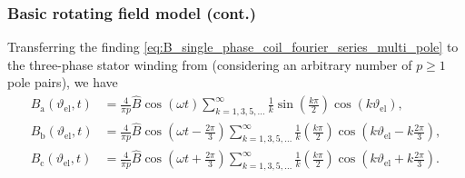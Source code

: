 \begin{frame}
	\frametitle{Basic rotating field model (cont.)}
    Transferring the finding \eqref{eq:B_single_phase_coil_fourier_series_multi_pole} to the three-phase stator winding from  (considering an arbitrary number of $p \geq 1$ pole pairs), we have
    \begin{equation}
        \begin{split}
            B_\mathrm{a}(\vartheta_\mathrm{el}, t) &= \frac{4}{\pi p} \hat{B} \cos(\omega t)\sum_{k=1,3,5,\ldots}^{\infty}   \frac{1}{k}\sin\left(\frac{k \pi}{2}\right) \cos(k \vartheta_\mathrm{el}),\\
            B_\mathrm{b}(\vartheta_\mathrm{el}, t) &= \frac{4}{\pi p} \hat{B} \cos\left(\omega t - \frac{2\pi}{3}\right)\sum_{k=1,3,5,\ldots}^{\infty}   \frac{1}{k}\left(\frac{k \pi}{2}\right) \cos\left(k \vartheta_\mathrm{el} - k\frac{2\pi}{3} \right),\\ 
            B_\mathrm{c}(\vartheta_\mathrm{el}, t) &= \frac{4}{\pi p} \hat{B} \cos\left(\omega t + \frac{2\pi}{3}\right)\sum_{k=1,3,5,\ldots}^{\infty}   \frac{1}{k}\left(\frac{k \pi}{2}\right) \cos\left(k \vartheta_\mathrm{el} +  k \frac{2\pi}{3}\right).
        \end{split}
        \label{eq:B_three_phase_stator_coil_fourier_series}
    \end{equation}
\end{frame}

